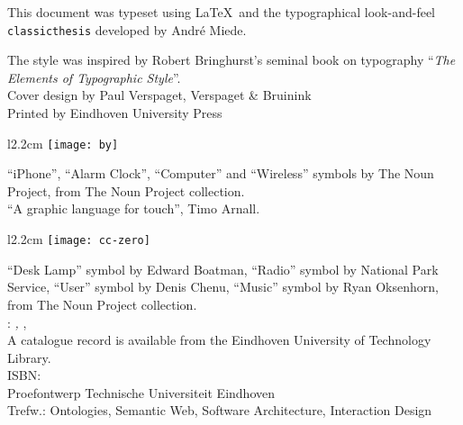 \thispagestyle{empty}

\hfill

\vfill

\noindent
This document was typeset using \LaTeX~and the typographical look-and-feel \texttt{classicthesis} developed by Andr\'e Miede.
 
The style was inspired by Robert Bringhurst's seminal book on typography ``\emph{The Elements of Typographic Style}''.\\

\noindent
Cover design by Paul Verspaget, Verspaget \& Bruinink\\

\noindent
Printed by Eindhoven University Press\\

\begin{wrapfigure}{l}{2.2cm} %
\centering
\texttt{[image: by]}
\end{wrapfigure}

\noindent
``iPhone'', ``Alarm Clock'', ``Computer'' and ``Wireless'' symbols by The Noun Project, from The Noun Project collection.\\
``A graphic language for touch'', Timo Arnall.\\

\begin{wrapfigure}{l}{2.2cm} 
\centering
\texttt{[image: cc-zero]}
\end{wrapfigure}

\noindent
``Desk Lamp'' symbol by Edward Boatman, ``Radio'' symbol by National Park Service, ``User'' symbol by Denis Chenu, ``Music'' symbol by Ryan Oksenhorn, from The Noun Project collection.\\


\noindent\myName: \textit{\myTitle,} \mySubtitle, %
\textcopyright\ \myTime\\

\noindent
A catalogue record is available from the Eindhoven University of Technology Library.\\
ISBN: \\

\noindent
Proefontwerp Technische Universiteit Eindhoven\\
Trefw.: Ontologies, Semantic Web, Software Architecture, Interaction Design


%
%
%
%
%
